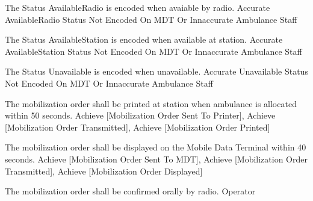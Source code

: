   \startkaosspec
  	 {The Status AvailableRadio is encoded when avaiable by radio.}
  	 {Accurate AvailableRadio Status Not Encoded On MDT Or Innaccurate}
  	 {Ambulance Staff}
  \stopkaosspec

  \startkaosspec
  	 {The Status AvailableStation is encoded when available at station.}
  	 {Accurate AvailableStation Status Not Encoded On MDT Or Innaccurate}
  	 {Ambulance Staff}
  \stopkaosspec

  \startkaosspec
  	 {The Status Unavailable is encoded when unavailable.}
  	 {Accurate Unavailable Status Not Encoded On MDT Or Innaccurate}
  	 {Ambulance Staff}
  \stopkaosspec

  
    {}

  \startkaosspec
  	 {The mobilization order shall be printed at station when ambulance is allocated within 50 seconds.}
  	 {Achieve [Mobilization Order Sent To Printer], Achieve [Mobilization Order Transmitted], Achieve [Mobilization Order Printed]}
  \stopkaosspec

  \startkaosspec
  	 {The mobilization order shall be displayed on the Mobile Data Terminal within 40 seconds.}
  	 {Achieve [Mobilization Order Sent To MDT], Achieve [Mobilization Order Transmitted], Achieve [Mobilization Order Displayed]}
  \stopkaosspec

  \startkaosspec
  	 {The mobilization order shall be confirmed orally by radio.}
  	 {Operator}
  \stopkaosspec

